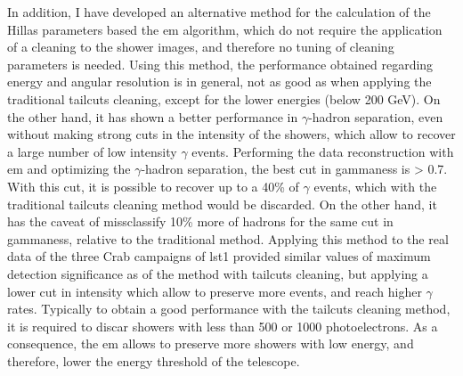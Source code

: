 \documentclass[main.tex]{subfiles}
\begin{document}
In addition, I have developed an alternative method for the calculation of the Hillas parameters based the \gls{em} algorithm, which do not require the application of a cleaning to the shower images, and therefore no tuning of cleaning parameters is needed. Using this method, the performance obtained regarding energy and angular resolution is in general, not as good as when applying the traditional tailcuts cleaning, except for the lower energies (below 200 GeV). On the other hand, it has shown a better performance in $\gamma$-hadron separation, even without making strong cuts in the intensity of the showers, which allow to recover a large number of low intensity $\gamma$ events. Performing the data reconstruction with \gls{em} and optimizing the $\gamma$-hadron separation, the best cut in gammaness is > 0.7. With this cut,  it is possible to recover up to a 40\% of $\gamma$ events, which with the traditional tailcuts cleaning method would be discarded. On the other hand, it has the caveat of missclassify 10\% more of hadrons for the same cut in gammaness, relative to the traditional method. Applying this method to the real data of the three Crab campaigns of \gls{lst}1 provided similar values of maximum detection significance as of the method with tailcuts cleaning, but applying a lower cut in intensity which allow to preserve more events, and reach higher $\gamma$ rates. Typically to obtain a good performance with the tailcuts cleaning method, it is required to discar showers with less than 500 or 1000 photoelectrons. As a consequence, the \gls{em} allows to preserve more showers with low energy, and therefore, lower the energy threshold of the telescope.\\ 
\end{document}
